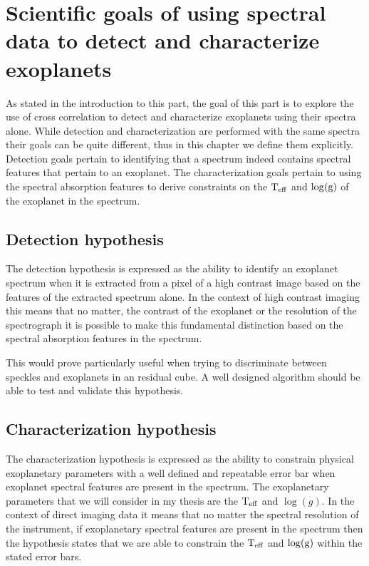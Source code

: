 \section{Scientific goals of using spectral data to detect and characterize exoplanets}
As stated in the introduction to this part, the goal of this part is to explore the use of cross correlation to detect and characterize exoplanets using their spectra alone.
While detection and characterization are performed with the same spectra their goals can be quite different, thus in this chapter we define them explicitly.
Detection goals pertain to identifying that a spectrum indeed contains spectral features that pertain to an exoplanet.
The characterization goals pertain to using the spectral absorption features to derive constraints on the $\rm{T_{eff}}$ and $\log(\rm{g})$ of the exoplanet in the spectrum.
\subsection{Detection hypothesis}
The detection hypothesis is expressed as the ability to identify an exoplanet spectrum when it is extracted from a pixel of a high contrast image based on the features of the extracted spectrum alone.
In the context of high contrast imaging this means that no matter, the contrast of the exoplanet or the resolution of the spectrograph it is possible to make this fundamental distinction based on the spectral absorption features in the spectrum.

This would prove particularly useful when trying to discriminate between speckles and exoplanets in an residual cube.
A well designed algorithm should be able to test and validate this hypothesis.

\subsection{Characterization hypothesis}
The characterization hypothesis is expressed as the ability to constrain physical exoplanetary parameters with a well defined and repeatable error bar when exoplanet spectral features are present in the spectrum.
The exoplanetary parameters that we will consider in my thesis are the $\rm{T_{eff}}$ and $\log(g)$.
In the context of direct imaging data it means that no matter the spectral resolution of the instrument, if exoplanetary spectral features are present in the spectrum then the hypothesis states that we are able to constrain the $\rm{T_{eff}}$ and $\log(\rm{g})$ within the stated error bars. 

